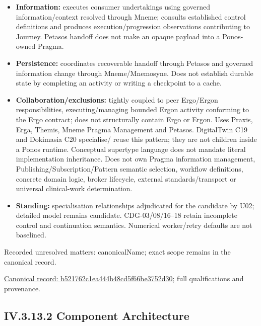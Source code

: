 \begin{itemize}
\item \textbf{Information:} executes consumer undertakings using governed information/context
  resolved through Mneme; consults established control definitions and produces
  execution/progression observations contributing to Journey. Petasos handoff
  does not make an opaque payload into a Ponos-owned Pragma.

\item \textbf{Persistence:} coordinates recoverable handoff through Petasos and governed
  information change through Mneme/Mnemosyne. Does not establish durable state
  by completing an activity or writing a checkpoint to a cache.

\item \textbf{Collaboration/exclusions:} tightly coupled to peer Ergo/Ergon responsibilities,
  executing/managing bounded Ergon activity conforming to the Ergo contract;
  does not structurally contain Ergo or Ergon. Uses Praxis, Erga, Themis, Mneme
  Pragma Management and Petasos. DigitalTwin C19 and Dokimasia C20 specialise/
  reuse this pattern; they are not children inside a Ponos runtime. Conceptual
  supertype language does not mandate literal implementation inheritance.
  Does not own Pragma information management, Publishing/Subscription/Pattern
  semantic selection, workflow definitions, concrete domain logic, broker lifecycle,
  external standards/transport or universal clinical-work determination.

\item \textbf{Standing:} specialisation relationships adjudicated for the candidate by U02;
  detailed model remains candidate. CDG-03/08/16–18 retain incomplete control
  and continuation semantics. Numerical worker/retry defaults are not baselined.

\end{itemize}

{\small Recorded unresolved matters: canonicalName; exact scope remains in the canonical record.}\par
{\footnotesize \href{../../../../../../../../continuum/application/application-component/b521762c1ea444b48cd5f66be3752d30.md}{Canonical record: b521762c1ea444b48cd5f66be3752d30}; full qualifications and provenance.}\par
\subsection*{IV.3.13.2 Component Architecture}
\label{navigation:IV.3.13.2}

